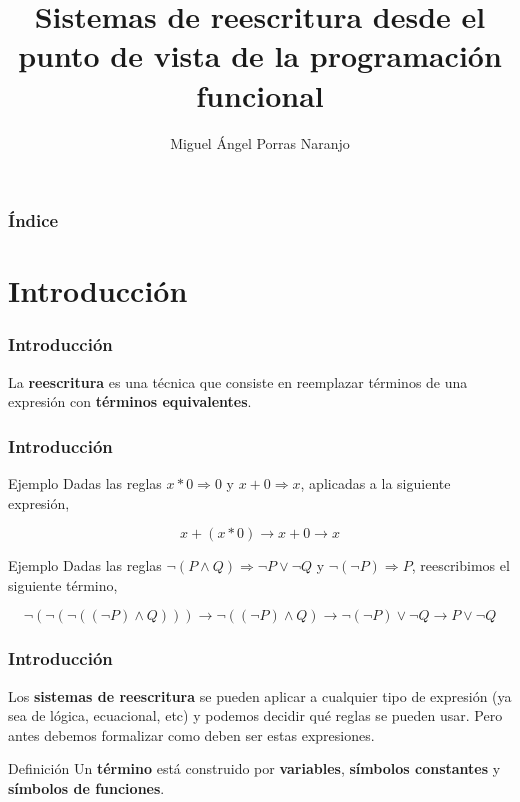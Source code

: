 \documentclass{beamer}
\title[Sistemas de reescritura]{Sistemas de reescritura desde el punto
  de vista de la programación funcional}
\author[Miguel Ángel Porras Naranjo]{Miguel Ángel Porras Naranjo}
\institute[Dpto. Ciencias de la Computación e Inteligencia
Artificial]{Tutorizado por José Antonio Alonso y María José Hidalgo}
\begin{document}
\lstset{language=Haskell}
\frame{\titlepage}

\begin{frame}
  \frametitle{Índice}
  \tableofcontents
\end{frame}

\section{Introducción}

\begin{frame}
  \frametitle{Introducción}

  \begin{block}{}
    La \textbf{reescritura} es una técnica que consiste en reemplazar
    términos de una expresión con \textbf{términos equivalentes}.
  \end{block}
\end{frame}

\begin{frame}
  \frametitle{Introducción}
  \begin{block}{Ejemplo}
    Dadas las reglas $x * 0 \Rightarrow 0$ y $x+0 \Rightarrow x$,
    aplicadas a la siguiente expresión,

    \[x +(x*0) \longrightarrow x+0 \longrightarrow x \]
  \end{block}

  \begin{block}{Ejemplo}
    Dadas las reglas
    $\neg (P \wedge Q) \Rightarrow \neg P \vee \neg Q$ y
    $\neg (\neg P) \Rightarrow P$, reescribimos el siguiente término,

    \[\neg (\neg (\neg ((\neg P) \wedge Q))) \longrightarrow \neg
      ((\neg P) \wedge Q) \longrightarrow \neg (\neg P) \vee \neg Q
      \longrightarrow P \vee \neg Q\]
  \end{block}
\end{frame}

\begin{frame}
  \frametitle{Introducción}
  \begin{block}{}
    Los \textbf{sistemas de reescritura} se pueden aplicar a cualquier
    tipo de expresión (ya sea de lógica, ecuacional, etc) y podemos
    decidir qué reglas se pueden usar. Pero antes debemos formalizar
    como deben ser estas expresiones.
  \end{block}

  \begin{block}{Definición}
    Un \textbf{término} está construido por \textbf{variables},
    \textbf{símbolos constantes} y \textbf{símbolos de funciones}.
  \end{block}
\end{frame}
\end{document}
